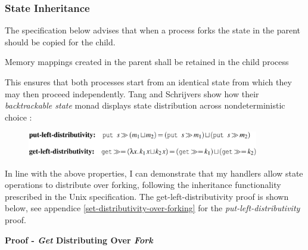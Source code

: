 \documentclass[logo,bsc,singlespacing,parskip]{infthesis}
\begin{document}
\subsubsection{State Inheritance} 
The specification below advises that when a process forks the state in the parent should be copied for the child.
\begin{tcolorbox}[colback=gray!10, colframe=gray!60, sharp corners, boxrule=0.5pt, title={POSIX Base Specifications, Issue 7, p.897}]
Memory mappings created in the parent shall be retained in the child process
\end{tcolorbox}
 This ensures that both processes start from an identical state from which they may then proceed independently. Tang and Schrijvers  show how their \textit{backtrackable state} monad displays state distribution across nondeterministic choice \cite{tang2025high} :


\begin{figure}[H]  %
  \centering
  \includegraphics[width=0.9\textwidth]{distributivity.png}  %
  
\end{figure}

In line with the above properties, I can demonstrate that my handlers allow state operations to distribute over forking, following the inheritance functionality prescribed in the Unix specification. The get-left-distributivity proof is shown below, see appendice \ref{set-distributivity-over-forking} for the \textit{put-left-distributivity} proof.


{\large{\textbf{Proof - \textit{Get} Distributing Over \textit{Fork}}}}
\end{document}
